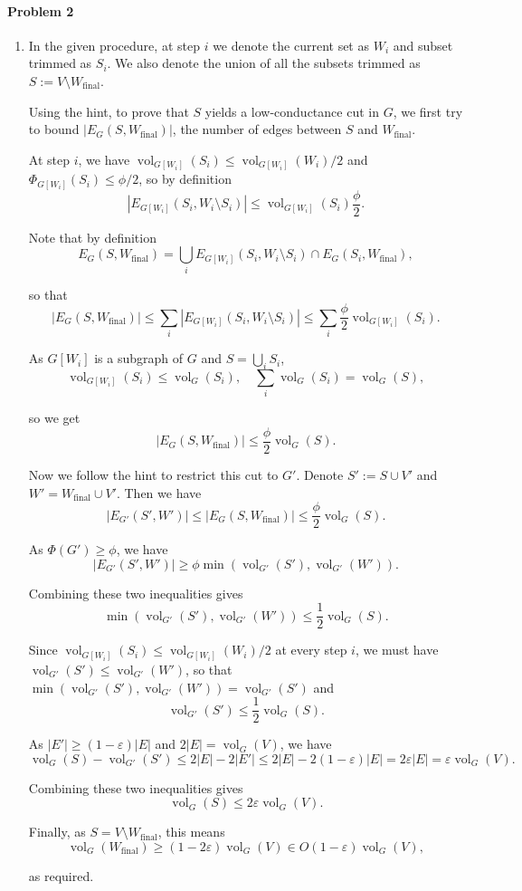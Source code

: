\documentclass[12pt]{article}
\DeclareMathOperator{\vol}{vol}
\begin{document}
\paragraph{Problem 2}
\begin{enumerate}[label=\alph*., font=\bfseries]
\item
In the given procedure, at step $i$ we denote the current set as $W_i$ and subset trimmed as $S_i$. We also denote the union of all the subsets trimmed as $S:=V\setminus W_{\mathrm{final}}$.

Using the hint, to prove that $S$ yields a low-conductance cut in $G$, we first try to bound $|E_G(S, W_{\mathrm{final}})|$, the number of edges between $S$ and $W_{\mathrm{final}}$.

At step $i$, we have $\vol_{G[W_i]}(S_i)\le\vol_{G[W_i]}(W_i)/2$ and $\Phi_{G[W_i]}(S_i)\le\phi/2$, so by definition
\[|E_{G[W_i]}(S_i,W_i\setminus S_i)|\le\vol_{G[W_i]}(S_i)\dfrac{\phi}{2}.\]

Note that by definition
\[E_G(S, W_{\mathrm{final}})=\bigcup_i E_{G[W_i]}(S_i,W_i\setminus S_i)\cap E_G(S_i,W_{\mathrm{final}}),\]

so that
\[|E_G(S, W_{\mathrm{final}})|\le\sum_i|E_{G[W_i]}(S_i,W_i\setminus S_i)|\le\sum_i\dfrac{\phi}{2}\vol_{G[W_i]}(S_i).\]

As $G[W_i]$ is a subgraph of $G$ and $S=\bigcup_{i}S_i$,
\[\vol_{G[W_i]}(S_i)\le\vol_{G}(S_i),\quad\sum_i\vol_{G}(S_i)=\vol_G(S),\]

so we get
\[|E_G(S, W_{\mathrm{final}})|\le\dfrac{\phi}{2}\vol_G(S).\]

Now we follow the hint to restrict this cut to $G'$. Denote $S':=S\cup V'$ and $W'=W_{\mathrm{final}}\cup V'$. Then we have
\[|E_{G'}(S', W')|\le |E_G(S, W_{\mathrm{final}})|\le\dfrac{\phi}{2}\vol_G(S).\]

As $\Phi(G')\ge\phi$, we have
\[|E_{G'}(S', W')|\ge\phi\min(\vol_{G'}(S'),\vol_{G'}(W')).\]

Combining these two inequalities gives
\[\min(\vol_{G'}(S'),\vol_{G'}(W'))\le\dfrac{1}{2}\vol_G(S).\]

Since $\vol_{G[W_i]}(S_i)\le\vol_{G[W_i]}(W_i)/2$ at every step $i$, we must have $\vol_{G'}(S')\le\vol_{G'}(W')$, so that $\min(\vol_{G'}(S'),\vol_{G'}(W'))=\vol_{G'}(S')$ and
\[\vol_{G'}(S')\le\dfrac{1}{2}\vol_G(S).\]

As $|E'|\ge(1-\varepsilon)|E|$ and $2|E|=\vol_G(V)$, we have
\[\vol_{G}(S)-\vol_{G'}(S')\le 2|E|-2|E'|\le2|E|-2(1-\varepsilon)|E|=2\varepsilon|E|=\varepsilon\vol_G(V).\]

Combining these two inequalities gives
\[\vol_{G}(S)\le2\varepsilon\vol_G(V).\]

Finally, as $S=V\setminus W_{\mathrm{final}}$, this means
\[\vol_{G}(W_{\mathrm{final}})\ge(1-2\varepsilon)\vol_G(V)\in O(1-\varepsilon)\vol_G(V),\]

as required.
\end{enumerate}
\end{document}
